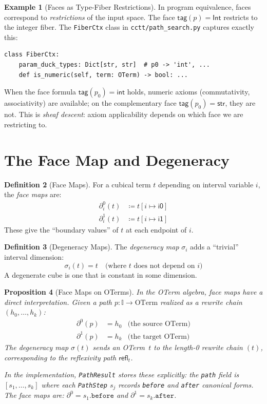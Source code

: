 \documentclass[11pt,a4paper]{report}
\theoremstyle{definition}
\newtheorem{definition}{Definition}[chapter]
\newtheorem{example}[definition]{Example}
\theoremstyle{plain}
\newtheorem{proposition}[definition]{Proposition}
\newcommand{\interval}{\mathbb{I}}
\begin{document}
\begin{example}[Faces as Type-Fiber Restrictions]
\label{ex:face-fiber}
In program equivalence, faces correspond to \emph{restrictions} of
the input space.  The face $\mathsf{tag}(p) = \mathsf{Int}$ restricts
to the integer fiber.  The \texttt{FiberCtx} class in
\texttt{cctt/path\_search.py} captures exactly this:
\begin{lstlisting}
class FiberCtx:
    param_duck_types: Dict[str, str]  # p0 -> 'int', ...
    def is_numeric(self, term: OTerm) -> bool: ...
\end{lstlisting}
When the face formula $\mathsf{tag}(p_0) = \mathsf{int}$ holds,
numeric axioms (commutativity, associativity) are available;
on the complementary face $\mathsf{tag}(p_0) = \mathsf{str}$,
they are not.  This is \emph{sheaf descent}: axiom applicability
depends on which face we are restricting to.
\end{example}

\section{The Face Map and Degeneracy}

\begin{definition}[Face Maps]
\label{def:face-maps}
For a cubical term $t$ depending on interval variable $i$, the
\emph{face maps} are:
\begin{align}
  \partial_i^0(t) &\coloneqq t[i \mapsto \mathsf{i0}] \\
  \partial_i^1(t) &\coloneqq t[i \mapsto \mathsf{i1}]
\end{align}
These give the ``boundary values'' of $t$ at each endpoint of $i$.
\end{definition}

\begin{definition}[Degeneracy Maps]
\label{def:degeneracy}
The \emph{degeneracy map} $\sigma_i$ adds a ``trivial'' interval
dimension:
\[
  \sigma_i(t) = t \quad \text{(where $t$ does not depend on $i$)}
\]
A degenerate cube is one that is constant in some dimension.
\end{definition}

\begin{proposition}[Face Maps on OTerms]
\label{prop:face-maps-oterm}
In the OTerm algebra, face maps have a direct interpretation.
Given a path $p : \interval \to \mathrm{OTerm}$ realized as a rewrite
chain $(h_0, \ldots, h_k)$:
\begin{align}
  \partial^0(p) &= h_0 & \text{(the source OTerm)} \\
  \partial^1(p) &= h_k & \text{(the target OTerm)}
\end{align}
The degeneracy map $\sigma(t)$ sends an OTerm~$t$ to the length-0
rewrite chain $(t)$, corresponding to the reflexivity path
$\mathsf{refl}_t$.

In the implementation, \texttt{PathResult} stores these explicitly:
the \texttt{path} field is $[s_1, \ldots, s_k]$ where each
\texttt{PathStep} $s_j$ records \texttt{before} and \texttt{after}
canonical forms.  The face maps are:
$\partial^0 = s_1.\texttt{before}$ and
$\partial^1 = s_k.\texttt{after}$.
\end{proposition}
\end{document}
